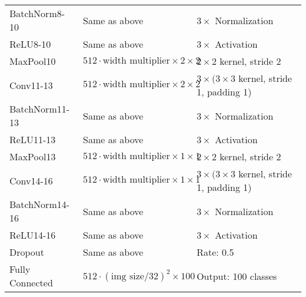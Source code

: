 \begin{table}[h]
\begin{tabular}{lll}
    BatchNorm8-10 & Same as above & $3 \times$ Normalization \\
    ReLU8-10 & Same as above & $3 \times$ Activation \\
    MaxPool10 & $512 \cdot \text{width multiplier} \times 2 \times 2$ & $2 \times 2$ kernel, stride 2 \\
    Conv11-13 & $512 \cdot \text{width multiplier} \times 2 \times 2$ & $3 \times (3 \times 3$ kernel, stride 1, padding 1) \\
    BatchNorm11-13 & Same as above & $3 \times$ Normalization \\
    ReLU11-13 & Same as above & $3 \times$ Activation \\
    MaxPool13 & $512 \cdot \text{width multiplier} \times 1 \times 1$ & $2 \times 2$ kernel, stride 2 \\
    Conv14-16 & $512 \cdot \text{width multiplier} \times 1 \times 1$ & $3 \times (3 \times 3$ kernel, stride 1, padding 1) \\
    BatchNorm14-16 & Same as above & $3 \times$ Normalization \\
    ReLU14-16 & Same as above & $3 \times$ Activation \\
    Dropout & Same as above & Rate: 0.5 \\
    Fully Connected & $512 \cdot (\text{img size}/32)^2 \times 100$ & Output: 100 classes \\
    \bottomrule
    \end{tabular}
\end{table}
